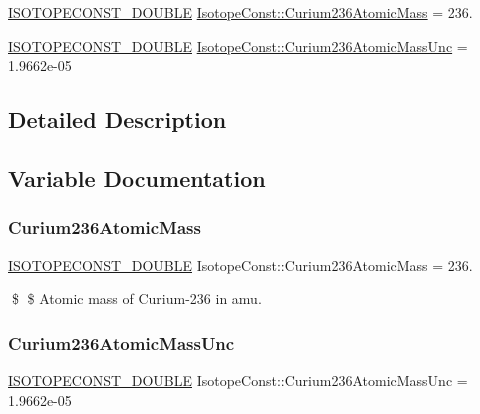 \begin{DoxyCompactItemize}
\item 
\mbox{\hyperlink{group___isotope_const-_macros_ga8f45a7272ce02c0b4c65c44636ed719a}{I\+S\+O\+T\+O\+P\+E\+C\+O\+N\+S\+T\+\_\+\+D\+O\+U\+B\+LE}} \mbox{\hyperlink{group___isotope_const-_curium-_cm236_gaee758e7a665f8245e8bccad7fa61dd56}{Isotope\+Const\+::\+Curium236\+Atomic\+Mass}} = 236.
\item 
\mbox{\hyperlink{group___isotope_const-_macros_ga8f45a7272ce02c0b4c65c44636ed719a}{I\+S\+O\+T\+O\+P\+E\+C\+O\+N\+S\+T\+\_\+\+D\+O\+U\+B\+LE}} \mbox{\hyperlink{group___isotope_const-_curium-_cm236_ga075ed2b2ccce56f0cf27623a0686b490}{Isotope\+Const\+::\+Curium236\+Atomic\+Mass\+Unc}} = 1.\+9662e-\/05
\end{DoxyCompactItemize}


\subsection{Detailed Description}


\subsection{Variable Documentation}
\mbox{\label{group___isotope_const-_curium-_cm236_gaee758e7a665f8245e8bccad7fa61dd56}} 
\subsubsection{\texorpdfstring{Curium236\+Atomic\+Mass}{Curium236AtomicMass}}
{\footnotesize\ttfamily \mbox{\hyperlink{group___isotope_const-_macros_ga8f45a7272ce02c0b4c65c44636ed719a}{I\+S\+O\+T\+O\+P\+E\+C\+O\+N\+S\+T\+\_\+\+D\+O\+U\+B\+LE}} Isotope\+Const\+::\+Curium236\+Atomic\+Mass = 236.}

\$ \$ Atomic mass of Curium-\/236 in amu. \mbox{\label{group___isotope_const-_curium-_cm236_ga075ed2b2ccce56f0cf27623a0686b490}} 
\subsubsection{\texorpdfstring{Curium236\+Atomic\+Mass\+Unc}{Curium236AtomicMassUnc}}
{\footnotesize\ttfamily \mbox{\hyperlink{group___isotope_const-_macros_ga8f45a7272ce02c0b4c65c44636ed719a}{I\+S\+O\+T\+O\+P\+E\+C\+O\+N\+S\+T\+\_\+\+D\+O\+U\+B\+LE}} Isotope\+Const\+::\+Curium236\+Atomic\+Mass\+Unc = 1.\+9662e-\/05}


